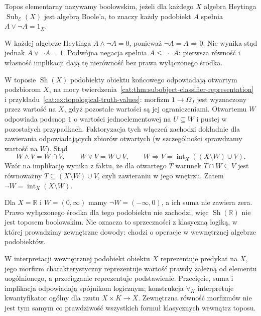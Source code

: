 \begin{definicja}\label{cat:def:boolean-topos}
Topos elementarny nazywamy boolowskim, jeżeli dla każdego $X$ algebra Heytinga $\operatorname{Sub}_{\mathcal E}(X)$ jest algebrą Boole'a, to znaczy każdy podobiekt $A$ spełnia $A\vee\neg A=1_X$.
\end{definicja}

W każdej algebrze Heytinga $A\wedge\neg A=0$, ponieważ $\neg A=A\Rightarrow0$. Nie wynika stąd jednak $A\vee\neg A=1$. Podwójna negacja spełnia $A\leq\neg\neg A$: pierwsza równość i własność implikacji dają tę nierówność bez prawa wyłączonego środka.

\begin{przyklad}\label{cat:ex:open-heyting}
W toposie $\operatorname{Sh}(X)$ podobiekty obiektu końcowego odpowiadają otwartym podzbiorom $X$, na mocy twierdzenia~\ref{cat:thm:subobject-classifier-representation} i przykładu~\ref{cat:ex:topological-truth-values}: morfizm $1\to\Omega_J$ jest wyznaczony przez wartość na $X$, gdyż pozostałe wartości są jej ograniczeniami. Otwartemu $W$ odpowiada podsnop $1$ o wartości jednoelementowej na $U\subseteq W$ i pustej w pozostałych przypadkach. Faktoryzacja tych włączeń zachodzi dokładnie dla zawierania odpowiadających zbiorów otwartych (w szczególności sprawdzamy wartość na $W$). Stąd
\[
 W\wedge V=W\cap V,\qquad W\vee V=W\cup V,\qquad
 W\Rightarrow V=\operatorname{int}_X((X\setminus W)\cup V).
\]
Wzór na implikację wynika z faktu, że dla otwartego $T$ warunek $T\cap W\subseteq V$ jest równoważny $T\subseteq(X\setminus W)\cup V$, czyli zawieraniu w jego wnętrzu. Zatem $\neg W=\operatorname{int}_X(X\setminus W)$.

Dla $X=\mathbb R$ i $W=(0,\infty)$ mamy $\neg W=(-\infty,0)$, a ich suma nie zawiera zera. Prawo wyłączonego środka dla tego podobiektu nie zachodzi, więc $\operatorname{Sh}(\mathbb R)$ nie jest toposem boolowskim. Nie oznacza to sprzeczności z klasyczną logiką, w której prowadzimy zewnętrzne dowody: chodzi o operacje w wewnętrznej algebrze podobiektów.
\end{przyklad}

W interpretacji wewnętrznej podobiekt obiektu $X$ reprezentuje predykat na $X$, jego morfizm charakterystyczny reprezentuje wartość prawdy zależną od elementu uogólnionego, a przeciąganie reprezentuje podstawienie. Przecięcie, suma i implikacja odpowiadają spójnikom logicznym; konstrukcja $\forall_K$ interpretuje kwantyfikator ogólny dla rzutu $X\times K\to X$. Zewnętrzna równość morfizmów nie jest tym samym co prawdziwość wszystkich formuł klasycznych wewnątrz toposu.

